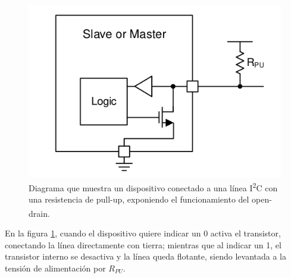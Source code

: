 \begin{figure}[h]
    \centering
    \includegraphics[scale=0.3]{Imagenes/Diagrama Open-Drain.png}
    \caption{Diagrama que muestra un dispositivo conectado a una línea I\textsuperscript{2}C con una resistencia de pull-up, exponiendo el funcionamiento del open-drain.\textsuperscript{\cite{I2C}}}
    \label{opendrain_i2c}
\end{figure}

En la figura \ref{opendrain_i2c}, cuando el dispositivo quiere indicar un 0 activa el transistor, conectando la línea directamente con tierra; mientras que al indicar un 1, el transistor interno se desactiva y la línea queda flotante, siendo levantada a la tensión de alimentación por $R_{PU}$.\\

